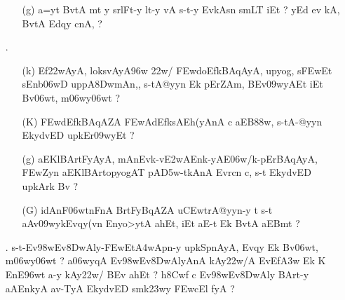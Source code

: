 \begin{itemize} 
\item[]		 \begin{itemize}
          \item[({\dn g})] {\dn a=y\?t BvtA\2 mt y srlFt-y lt-y vA s\2-t-y EvkAsn\2 s\2mLT\?{\qvb} iEt {\rs ?\re} yEd ev kA, BvtA\2 Edqy\? cnA, {\rs ?\re}}
          \end{itemize}                                         
          
\item[{\dn \dnnum \rn{8}}.]  \begin{itemize}
   
               \item[({\dn k})] {\dn Ef\322wAyA, loks\?vAyA\396w \322w\?/\?{\rs ,\re} \3FEwdoEfkBAqAyA, upyog, s\2\3FEwEt sEnb\0\306wD uppA\38DwmAn,{\rs ,\re} s\2-tA@yyn\? Ek\2 pErZAm, BEv\309wyAEt iEt Bv\306wt, m\306wy\306wt\? {\rs ?\re}}  
              
              \item[({\dn K})] {\dn \3FEwd\?EfkBAqAZA\2 \3FEwAd\?EfksAEh(yAnA\2 c aEB\388w\?, s\2-tA{\rs -\re}\-@yyn\2 EkydvED upkEr\309wyEt {\rs ?\re} }
              
              \item[({\dn g})] {\dn aEKlBArtFyAyA, mAnEvk{\rs -\re}v\4\3E2wAEnk{\rs -\re}yAE\306w/k{\rs -\re}\break\-pErBAqAyA, \3FEwZyn\?{\rs ,\re} aEKlBArtopyogAT{\rdt} pA\3D5w\--tkAnA\2 Evrcn\? c{\rs ,\re} s\2-t\2 EkydvED upkArk\2 Bv\? {\rs ?\re} } 
              
              \item[({\dn G})] {\dn idAnF\306wtnFnA\2 BrtFyBqAZA u\3CEwtrA@yyn-y t\? s\2-t aAv\309wykEvqy(v\?n Enyo>ytA ah\0Et{\rs ,\re} iEt aE-t Ek\2 BvtA aEBmt {\rs ?\re}}
                            
            \end{itemize}
 
 \item[{\dn \dnnum \rn{9}}.] {\dn s\2-t{\rs -\re}Ev\398wEv\38DwAly{\rs -\re}\3FEwEt\3A4wApn-y upkSpnAyA, Evqy\? Ek\2 Bv\306wt, m\306wy\306wt\? {\rs ?\re} a\306wy\?qA\2 Ev\398wEv\38DwAlyAnA\2 kAy\0\322w\?/A  EvEf\3A3w\2 Ek\2  K EnE\396wt a-y kAy\0\322w\?/\2 BEv ah\0Et {\rs ?\re} h\0\38Cwf\2 c Ev\398wEv\38DwAly\2 BArt-y aAEnkyA av-TyA EkydvED smk\323wy\2 \3FEwcEl\2 fyA {\rs ?\re}} 
   

\end{itemize}
